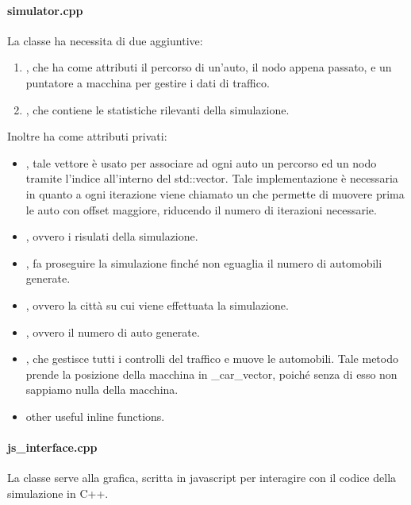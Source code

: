 \documentclass[main.tex]{subfiles}
\begin{document}
    \paragraph{simulator.cpp}
        La classe  ha necessita di due  aggiuntive:
        \begin{enumerate}
            \item {}, che ha come attributi il percorso di un'auto, il nodo appena passato, e un puntatore a macchina per gestire i dati di traffico.
            \item {}, che contiene le statistiche rilevanti della simulazione.
        \end{enumerate}
        Inoltre ha come attributi privati:
        \begin{itemize}
            \item {}, tale vettore è usato per associare ad ogni auto un percorso ed un nodo tramite l'indice 
                all'interno del std::vector. Tale implementazione è necessaria in quanto a ogni iterazione viene chiamato un  che permette di 
                muovere prima le auto con offset maggiore, riducendo il numero di iterazioni necessarie.
            \item {}, ovvero i risulati della simulazione.
            \item {}, fa proseguire la simulazione finché non eguaglia il numero di automobili generate.
            \item {}, ovvero la città su cui viene effettuata la simulazione.
            \item {}, ovvero il numero di auto generate.
            \item {}, che gestisce tutti i controlli del traffico e muove le automobili.
                Tale metodo prende la posizione della macchina in \_car\_vector, poiché senza di esso non sappiamo nulla della macchina.
            \item other useful inline functions.
        \end{itemize}
    \paragraph{js\_interface.cpp} 
        La classe  serve alla grafica, scritta in javascript per interagire con il codice della simulazione in C++.
\end{document}
